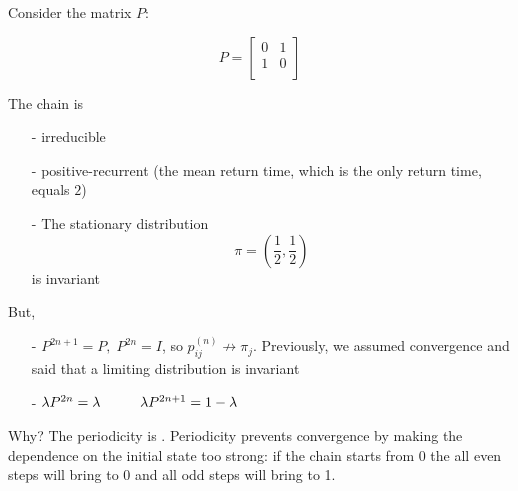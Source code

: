 \documentclass{article}
\begin{document}
\begin{example}
    Consider the matrix $P$:\\
    \begin{minipage}{0.5\textwidth}
     \center
        \[P=\begin{bmatrix}
        0 & 1 \\
        1 & 0 \\
    \end{bmatrix}\]
    \end{minipage} \hfill
    \begin{minipage}{0.45\textwidth}
    \begin{figure}[H]
            \centering
        \end{figure}
    \end{minipage}
    The chain is 
    \begin{itemize}
        \item [-] irreducible 
        \item [-] positive-recurrent (the mean return time, which is the only return time, equals $2$)
        \item [-] The stationary distribution
        \begin{equation*}
            \pi = (\frac{1}{2}, \frac{1}{2}) 
        \end{equation*}
        is invariant \checkmark
        \end{itemize}
     But, 
    \begin{itemize}
        \item [-] $P^{2n+1} = P, \;P^{2n} = I$, so $p_{ij}^{(n)} \not\rightarrow \pi_j$. Previously, we assumed convergence and  said that a limiting distribution is invariant
        \item [-] $\lambda P^{2n} = \lambda \hspace{1 cm} \lambda P^{2n+1}=1-\lambda$
    \end{itemize}
    Why? The periodicity is . Periodicity prevents convergence by making the dependence on the initial state too strong: if the chain starts from 0 the all even steps will bring to 0 and all odd steps will bring to 1.
\end{example}
\end{document}
